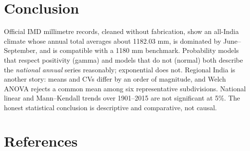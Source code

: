 \documentclass[
]{article}
\begin{document}
\section{Conclusion}\label{conclusion}

Official IMD millimetre records, cleaned without fabrication, show an
all-India climate whose annual total averages about 1182.03 mm, is
dominated by June--September, and is compatible with a 1180 mm
benchmark. Probability models that respect positivity (gamma) and models
that do not (normal) both describe the \emph{national annual} series
reasonably; exponential does not. Regional India is another story: means
and CVs differ by an order of magnitude, and Welch ANOVA rejects a
common mean among six representative subdivisions. National linear and
Mann--Kendall trends over 1901--2015 are not significant at 5\%. The
honest statistical conclusion is descriptive and comparative, not
causal.

\section{References}\label{references}
\end{document}
